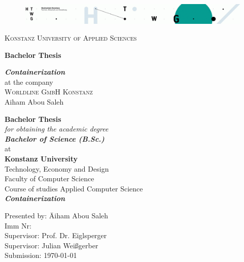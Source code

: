 
\begin{titlepage}
\vspace*{15mm}
\begin{figure}[h]
\centering
\includegraphics[width=\textwidth]{fig/ain}
\label{fig:unilogo}
\end{figure}
{
\center
{\LARGE \textsc{Konstanz University of Applied Sciences}}\\
\vspace*{10mm}

\textbf{{\Large Bachelor Thesis}}\\
\vspace*{40mm}

\textbf{{\Large \textit{Containerization}}}\\ \vspace*{5mm}
{at the company }\\
\vspace*{10mm}
{\Large \textsc{Worldline GmbH Konstanz}}\\
\vspace*{15mm}
{\Large Aiham Abou Saleh}

}


\newpage
\thispagestyle{empty}

{
\center
\vspace*{15mm}
{\Huge \textbf{Bachelor Thesis}}\\ \vspace*{5mm}
\emph{for obtaining the academic degree \\ \vspace*{5mm}
{\LARGE \textbf{Bachelor of Science (B.Sc.)}} }\\
\vspace*{10mm}
{at}\\
\vspace*{10mm}
{\large \textbf{Konstanz University}}\\ \vspace*{5mm}
{Technology, Economy and Design \\ \vspace*{1mm} Faculty of Computer Science  \\ \vspace*{1mm} 
Course of studies Applied Computer Science}\\ \vspace*{10mm}
{\LARGE \textbf{\textit{Containerization}}} 

}
\vspace*{20mm}
\begin{tabbing}
\hspace*{4cm}Presented by: \hspace*{2cm}\= Aiham Abou Saleh \\
\hspace*{4cm}Imm Nr:  \\
\hspace*{4cm}Supervisor: \> Prof. Dr. Eiglsperger\\
\hspace*{4cm}Supervisor: \> Julian Weißgerber\\
\hspace*{4cm}Submission: \> \today
\end{tabbing}
\end{titlepage}
